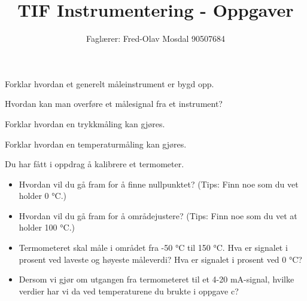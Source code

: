 \documentclass[12pt,a4paper]{article}
\def\oppgave{
		}
\begin{document}
\title{TIF Instrumentering - Oppgaver}
\author{Faglærer: Fred-Olav Mosdal 90507684\\}
\maketitle
\oppgave{}%
\vskip 2.5pt 
Forklar hvordan et generelt måleinstrument er bygd opp.
\vskip 5pt 
\vskip 2.5pt 
\oppgave{}%
\vskip 2.5pt 
Hvordan kan man overføre et målesignal fra et instrument?
\vskip 5pt 
\vskip 2.5pt 
\oppgave{}%
\vskip 2.5pt 
Forklar hvordan en trykkmåling kan gjøres.
\vskip 5pt 
\vskip 2.5pt 
\oppgave{}%
\vskip 2.5pt 
Forklar hvordan en temperaturmåling kan gjøres.
\vskip 5pt 
\vskip 2.5pt 
\oppgave{}%
\vskip 2.5pt 
Du har fått i oppdrag å kalibrere et termometer.
\begin{itemize}
	\item Hvordan vil du gå fram for å finne nullpunktet? (Tips: Finn noe som du vet holder 0 °C.)\\
	\item Hvordan vil du gå fram for å områdejustere? (Tips: Finn noe som du vet at holder 100 °C.)\\
 	\item Termometeret skal måle i området fra -50 °C til 150 °C. Hva er signalet i prosent ved laveste og høyeste måleverdi? Hva er signalet i prosent ved 0 °C?\\
	\item Dersom vi gjør om utgangen fra termometeret til et 4-20 mA-signal, hvilke verdier har vi da ved temperaturene du brukte i oppgave c?\\


\end{itemize}
\end{document}
